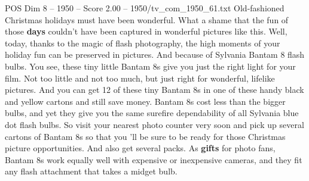 \begin{textsample}{POS Dim 8 – 1950 – Score 2.00 – 1950/tv\_com\_1950\_61.txt}  \label{ex:f8_pos_010}
Old-fashioned Christmas holidays must have been wonderful.
What a shame that the fun of those \textbf{days} couldn't have been captured in wonderful pictures like this.
Well, today, thanks to the magic of flash photography, the high moments of your holiday fun can be preserved in pictures.
And because of Sylvania Bantam 8 flash bulbs.
You see, these tiny little Bantam 8s give you just the right light for your film.
Not too little and not too much, but just right for wonderful, lifelike pictures.
And you can get 12 of these tiny Bantam 8s in one of these handy black and yellow cartons and still save money.
Bantam 8s cost less than the bigger bulbs, and yet they give you the same surefire dependability of all Sylvania blue dot flash bulbs.
So visit your nearest photo counter very soon and pick up several cartons of Bantam 8s so that you 'll be sure to be ready for those Christmas picture opportunities.
And also get several packs.
As \textbf{gifts} for photo fans, Bantam 8s work equally well with expensive or inexpensive cameras, and they fit any flash attachment that takes a midget bulb.

\end{textsample}
